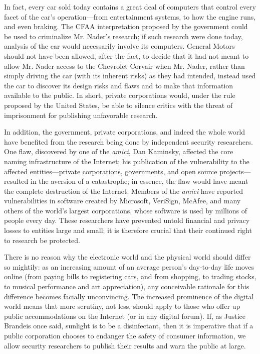 \documentclass{article}
\begin{document}
	In fact, every car sold today contains a great deal of computers that control every facet of the car's operation---from entertainment systems, to how the engine runs, and even braking. The CFAA interpretation proposed by the government could be used to criminalize Mr. Nader's research; if such research were done today, analysis of the car would necessarily involve its computers. General Motors should not have been allowed, after the fact, to decide that it had not meant to allow Mr. Nader access to the Chevrolet Corvair when Mr. Nader, rather than simply driving the car (with its inherent risks) as they had intended, instead used the car to discover its design risks and flaws and to make that information available to the public.	In short, private corporations would, under the rule proposed by the United States, be able to silence critics with the threat of imprisonment for publishing unfavorable research.
	
	In addition, the government, private corporations, and indeed the whole world have benefited from the research being done by independent security researchers. One flaw, discovered by one of the \emph{amici}, Dan Kaminsky, affected the core naming infrastructure of the Internet; his publication of the vulnerability to the affected entities---private corporations, governments, and open source projects---resulted in the aversion of a catastrophe; in essence, the flaw would have meant the complete destruction of the Internet. Members of the \emph{amici} have reported vulnerabilities in software created by Microsoft, VeriSign, McAfee, and many others of the world's largest corporations, whose software is used by millions of people every day. These researchers have prevented untold financial and privacy losses to entities large and small; it is therefore crucial that their continued right to research be protected.
	
	There is no reason why the electronic world and the physical world should differ so mightily: as an increasing amount of an average person's day-to-day life moves online (from paying bills to registering cars, and from shopping, to trading stocks, to musical performance and art appreciation), any conceivable rationale for this difference becomes facially unconvincing. The increased prominence of the digital world means that more scrutiny, not less, should apply to those who offer up public accommodations on the Internet (or in any digital forum). If, as Justice Brandeis once said, sunlight is to be a disinfectant, then it is imperative that if a public corporation chooses to endanger the safety of consumer information, we allow security researchers to publish their results and warn the public at large.
	
\end{document}
